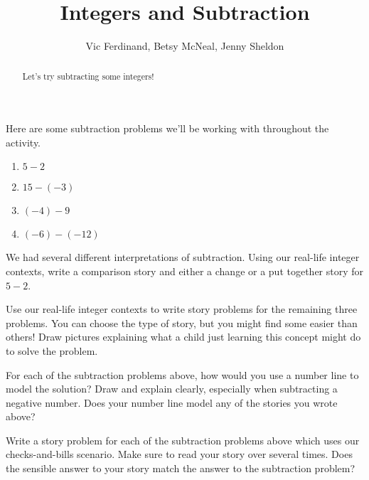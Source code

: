 \documentclass{ximera}
\title{Integers and Subtraction}
\author{Vic Ferdinand, Betsy McNeal, Jenny Sheldon}
\begin{document}
\begin{abstract}
    Let's try subtracting some integers!
\end{abstract}
\maketitle



Here are some subtraction problems we'll be working with throughout the activity.

\begin{enumerate}
    \item $5 - 2$
    \item $15 - (-3)$
    \item $(-4) - 9$
    \item $(-6) - (-12)$
\end{enumerate}

\begin{problem}
We had several different interpretations of subtraction.  Using our real-life integer contexts, write a comparison story and either a change or a put together story for $5 - 2$.

\end{problem}

\begin{problem}
Use our real-life integer contexts to write story problems for the remaining three problems.  You can choose the type of story, but you might find some easier than others!  Draw pictures explaining what a child just learning this concept might do to solve the problem.


\end{problem}

\begin{problem}
For each of the subtraction problems above, how would you use a number line to model the solution?  Draw and explain clearly, especially when subtracting a negative number.  Does your number line model any of the stories you wrote above?
\end{problem}

\begin{problem}
Write a story problem for each of the subtraction problems above which uses our checks-and-bills scenario.  Make sure to read your story over several times.  Does the sensible answer to your story match the answer to the subtraction problem?
\end{problem}
\end{document}
